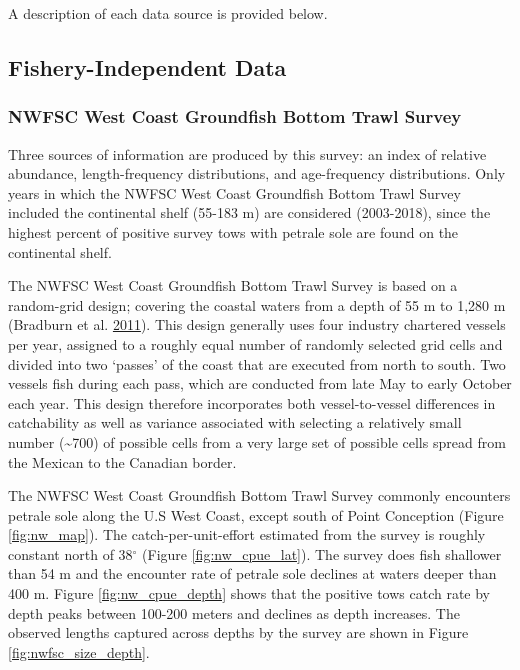 \documentclass[12pt,]{article}
\begin{document}
A description of each data source is provided below.

\subsection{Fishery-Independent Data}\label{fishery-independent-data}

\subsubsection{NWFSC West Coast Groundfish Bottom Trawl
Survey}\label{nwfsc-west-coast-groundfish-bottom-trawl-survey}

Three sources of information are produced by this survey: an index of
relative abundance, length-frequency distributions, and age-frequency
distributions. Only years in which the NWFSC West Coast Groundfish
Bottom Trawl Survey included the continental shelf (55-183 m) are
considered (2003-2018), since the highest percent of positive survey
tows with petrale sole are found on the continental shelf.

The NWFSC West Coast Groundfish Bottom Trawl Survey is based on a
random-grid design; covering the coastal waters from a depth of 55 m to
1,280 m (Bradburn et al.
\protect\hyperlink{ref-bradburn_2003_2011}{2011}). This design generally
uses four industry chartered vessels per year, assigned to a roughly
equal number of randomly selected grid cells and divided into two
`passes' of the coast that are executed from north to south. Two vessels
fish during each pass, which are conducted from late May to early
October each year. This design therefore incorporates both
vessel-to-vessel differences in catchability as well as variance
associated with selecting a relatively small number
(\textasciitilde{}700) of possible cells from a very large set of
possible cells spread from the Mexican to the Canadian border.

The NWFSC West Coast Groundfish Bottom Trawl Survey commonly encounters
petrale sole along the U.S West Coast, except south of Point Conception
(Figure \ref{fig:nw_map}). The catch-per-unit-effort estimated from the
survey is roughly constant north of 38\(^\circ\) (Figure
\ref{fig:nw_cpue_lat}). The survey does fish shallower than 54 m and the
encounter rate of petrale sole declines at waters deeper than 400 m.
Figure \ref{fig:nw_cpue_depth} shows that the positive tows catch rate
by depth peaks between 100-200 meters and declines as depth increases.
The observed lengths captured across depths by the survey are shown in
Figure \ref{fig:nwfsc_size_depth}.
\end{document}
